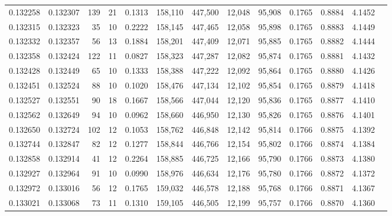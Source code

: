 \begin{tabular}{rrrrrrrrrrrrr}
0.132258 & 0.132307 &   139 &  21 &                                     0.1313 & 158,110 & 447,500 &  12,048 &  95,908 & 0.1765 & 0.8884 & 4.1452 \\
0.132315 & 0.132323 &    35 &  10 &                                     0.2222 & 158,145 & 447,465 &  12,058 &  95,898 & 0.1765 & 0.8883 & 4.1449 \\
0.132332 & 0.132357 &    56 &  13 &                                     0.1884 & 158,201 & 447,409 &  12,071 &  95,885 & 0.1765 & 0.8882 & 4.1444 \\
0.132358 & 0.132424 &   122 &  11 &                                     0.0827 & 158,323 & 447,287 &  12,082 &  95,874 & 0.1765 & 0.8881 & 4.1432 \\
0.132428 & 0.132449 &    65 &  10 &                                     0.1333 & 158,388 & 447,222 &  12,092 &  95,864 & 0.1765 & 0.8880 & 4.1426 \\
0.132451 & 0.132524 &    88 &  10 &                                     0.1020 & 158,476 & 447,134 &  12,102 &  95,854 & 0.1765 & 0.8879 & 4.1418 \\
0.132527 & 0.132551 &    90 &  18 &                                     0.1667 & 158,566 & 447,044 &  12,120 &  95,836 & 0.1765 & 0.8877 & 4.1410 \\
0.132562 & 0.132649 &    94 &  10 &                                     0.0962 & 158,660 & 446,950 &  12,130 &  95,826 & 0.1765 & 0.8876 & 4.1401 \\
0.132650 & 0.132724 &   102 &  12 &                                     0.1053 & 158,762 & 446,848 &  12,142 &  95,814 & 0.1766 & 0.8875 & 4.1392 \\
0.132744 & 0.132847 &    82 &  12 &                                     0.1277 & 158,844 & 446,766 &  12,154 &  95,802 & 0.1766 & 0.8874 & 4.1384 \\
0.132858 & 0.132914 &    41 &  12 &                                     0.2264 & 158,885 & 446,725 &  12,166 &  95,790 & 0.1766 & 0.8873 & 4.1380 \\
0.132927 & 0.132964 &    91 &  10 &                                     0.0990 & 158,976 & 446,634 &  12,176 &  95,780 & 0.1766 & 0.8872 & 4.1372 \\
0.132972 & 0.133016 &    56 &  12 &                                     0.1765 & 159,032 & 446,578 &  12,188 &  95,768 & 0.1766 & 0.8871 & 4.1367 \\
0.133021 & 0.133068 &    73 &  11 &                                     0.1310 & 159,105 & 446,505 &  12,199 &  95,757 & 0.1766 & 0.8870 & 4.1360 \\

\end{tabular}
